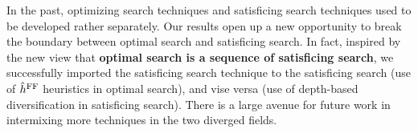 In the past, optimizing search
techniques and satisficing search
techniques used to be
developed rather separately.
Our results open up a new opportunity to break the boundary between
optimal search and satisficing search. In fact, inspired by the new
view that \textbf{optimal search is a sequence of satisficing
search}, we successfully imported the satisficing search technique
to the satisficing search (use of $\hat{h}^{\text{FF}}$ heuristics in optimal search), and vise versa
(use of depth-based diversification in satisficing search).
There is a large avenue for future work in 
intermixing more techniques in the two diverged fields.
